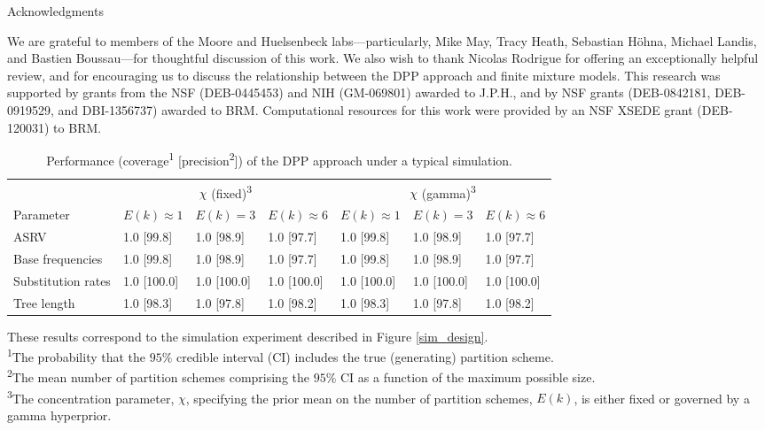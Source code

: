 \documentclass[11pt]{article}
\begin{document}
\begin{center}
{\sc Acknowledgments}
\end{center}

\noindent
We are grateful to members of the Moore and Huelsenbeck labs---particularly, Mike May, Tracy Heath, Sebastian H\"ohna, Michael Landis, and Bastien Boussau---for thoughtful discussion of this work.
We also wish to thank Nicolas Rodrigue for offering an exceptionally helpful review, and for encouraging us to discuss the relationship between the DPP approach and finite mixture models.
This research was supported by grants from the NSF (DEB-0445453) and NIH (GM-069801) awarded to J.P.H., and by NSF grants (DEB-0842181, DEB-0919529, and DBI-1356737) awarded to BRM.
Computational resources for this work were provided by an NSF XSEDE grant (DEB-120031) to BRM.

\newpage


\newpage
\begin{table}[h!]
\caption{Performance (coverage\textsuperscript{1} [precision\textsuperscript{2}]) of the DPP approach under a typical simulation.}
\centering
\begin{tabular}{lllllll}
\toprule
& \multicolumn{3}{c}{$\chi$ (fixed)\textsuperscript{3}}  & \multicolumn{3}{c}{$\chi$ (gamma)\textsuperscript{3}} \\
\cmidrule(r){2-4} \cmidrule(r){5-7}
Parameter & $E(k) \approx 1$ & $E(k) =3$ & $E(k) \approx 6$ & $E(k) \approx 1$ & $E(k) =3$ & $E(k) \approx 6$ \\ 
\midrule
ASRV & 1.0 [99.8] & 1.0 [98.9] & 1.0 [97.7] & 1.0 [99.8] & 1.0 [98.9] & 1.0 [97.7] \\ 
\rowcolor{gray!20}
Base frequencies & 1.0 [99.8] & 1.0 [98.9] & 1.0 [97.7] & 1.0 [99.8] & 1.0 [98.9] & 1.0 [97.7] \\ 
Substitution rates & 1.0 [100.0] & 1.0 [100.0] & 1.0 [100.0] & 1.0 [100.0] & 1.0 [100.0] & 1.0 [100.0]  \\ 
\rowcolor{gray!20}
Tree length & 1.0 [98.3] & 1.0 [97.8] & 1.0 [98.2] & 1.0 [98.3] & 1.0 [97.8] & 1.0 [98.2]  \\ 
\end{tabular}

\medskip
{\fontsize{9}{9}\selectfont
\begin{adjustwidth}{.2cm}{.1cm}
These results correspond to the simulation experiment described in Figure \ref{sim_design}.\\
\textsuperscript{1}The probability that the $95\%$ credible interval (CI) includes the true (generating) partition scheme.\\
\textsuperscript{2}The mean number of partition schemes comprising the $95\%$ CI as a function of the maximum possible size.\\
\textsuperscript{3}The concentration parameter, $\chi$, specifying the prior mean on the number of partition schemes, $E(k)$, is either fixed or governed by a gamma hyperprior.
\end{adjustwidth}}
\label{tab:simulation}
\end{table}
\end{document}
